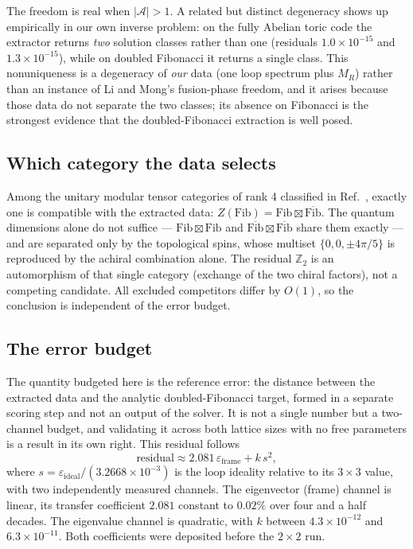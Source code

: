 \documentclass[aps,pra,twocolumn,superscriptaddress,longbibliography,floatfix,nofootinbib]{revtex4-2}
\begin{document}
The freedom is real when $|\mathcal{A}|>1$. A related but distinct degeneracy
shows up empirically in our own inverse problem: on the fully Abelian toric
code the extractor returns \emph{two} solution classes rather than one
(residuals $1.0\times10^{-15}$ and $1.3\times10^{-15}$), while on doubled
Fibonacci it returns a single class. This nonuniqueness is a degeneracy of
\emph{our} data (one loop spectrum plus $M_R$) rather than an instance of Li
and Mong's fusion-phase freedom, and it arises because those data do not
separate the two classes; its absence on Fibonacci is the strongest evidence
that the doubled-Fibonacci extraction is well posed.

\subsection{Which category the data selects}
\label{sec:whichcategory}

Among the unitary modular tensor categories of rank 4 classified in
Ref.~\cite{RSW2009}, exactly one is compatible with the extracted data:
$Z(\mathrm{Fib})=\mathrm{Fib}\boxtimes\overline{\mathrm{Fib}}$. The quantum
dimensions alone do not suffice --- $\mathrm{Fib}\boxtimes\mathrm{Fib}$ and
$\overline{\mathrm{Fib}}\boxtimes\overline{\mathrm{Fib}}$ share them exactly
--- and are separated only by the topological spins, whose multiset
$\{0,0,\pm4\pi/5\}$ is reproduced by the achiral combination alone. The
residual $\mathbb{Z}_2$ is an automorphism of that single category (exchange of
the two chiral factors), not a competing candidate. All excluded competitors
differ by $O(1)$, so the conclusion is independent of the error budget.

\subsection{The error budget}
\label{sec:errorbudget}

The quantity budgeted here is the reference error: the distance between the
extracted data and the analytic doubled-Fibonacci target, formed in a
separate scoring step and not an output of the solver. It is not a single
number but a two-channel budget, and validating it across both lattice sizes
with no free parameters is a result in its own right. This residual follows
\begin{equation}
  \text{residual} \approx 2.081\,\varepsilon_{\mathrm{frame}} + k\,s^{2},
  \label{eq:budget}
\end{equation}
where $s=\varepsilon_{\mathrm{ideal}}/(3.2668\times10^{-3})$ is the loop
ideality relative to its $3\times3$ value, with two independently measured
channels. The eigenvector (frame) channel is
linear, its transfer coefficient $2.081$ constant to $0.02\%$ over four and a
half decades. The eigenvalue channel is quadratic, with $k$ between
$4.3\times10^{-12}$ and $6.3\times10^{-11}$. Both coefficients were deposited
before the $2\times2$ run.
\end{document}
